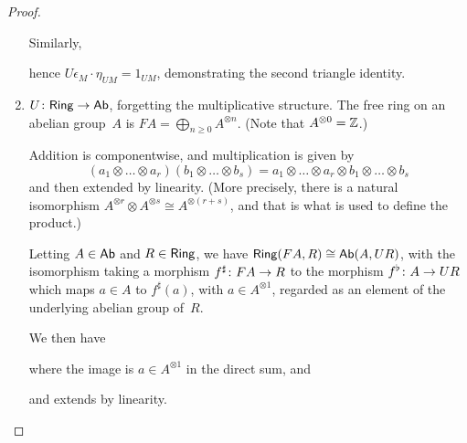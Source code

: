 \documentclass[../../solutions]{subfiles}
\begin{document}
\begin{proof}
\begin{enumerate}[label=(\roman*)]
    Similarly,
    \begin{center}
    \end{center}
    hence $U\epsilon_M\cdot \eta_{UM}=1_{UM}$, demonstrating the
    second triangle identity.

  \item ${U}\colon{\ensuremath{\mathsf{Ring}}}\to{\ensuremath{\mathsf{Ab}}}$, forgetting the multiplicative
    structure.  The free ring on an abelian group~$A$
    is $FA=\bigoplus_{n\ge0} A^{\otimes n}$.  (Note that $A^{\otimes
      0}={\mathbb{Z}}$.)

    Addition is componentwise, and multiplication is given by
    $$(a_1\otimes \dots \otimes a_r)(b_1\otimes \dots \otimes b_s) =
    a_1\otimes \dots \otimes a_r \otimes b_1 \otimes \dots \otimes
    b_s$$
    and then extended by linearity.  (More precisely, there is a
    natural isomorphism $A^{\otimes r}\otimes A^{\otimes s}\cong
    A^{\otimes(r+s)}$, and that is what is used to define the
    product.)

    Letting $A\in\mathsf{Ab}$ and $R\in\mathsf{Ring}$, we have
    $\mathsf{Ring}(FA, R)\cong \mathsf{Ab}(A,UR)$, with the isomorphism taking a
    morphism ${f^\sharp}\colon{FA}\to{R}$ to the morphism
    ${f^\flat}\colon{A}\to{UR}$ which maps $a\in A$ to $f^\sharp(a)$, with
    $a\in A^{\otimes 1}$, regarded as an element of the underlying
    abelian group of~$R$.

    We then have
    \begin{center}
    \end{center}
    where the image is $a\in A^{\otimes1}$ in the direct sum, and
    \begin{center}
    \end{center}
    and extends by linearity.


\end{enumerate}
\end{proof}
\end{document}
